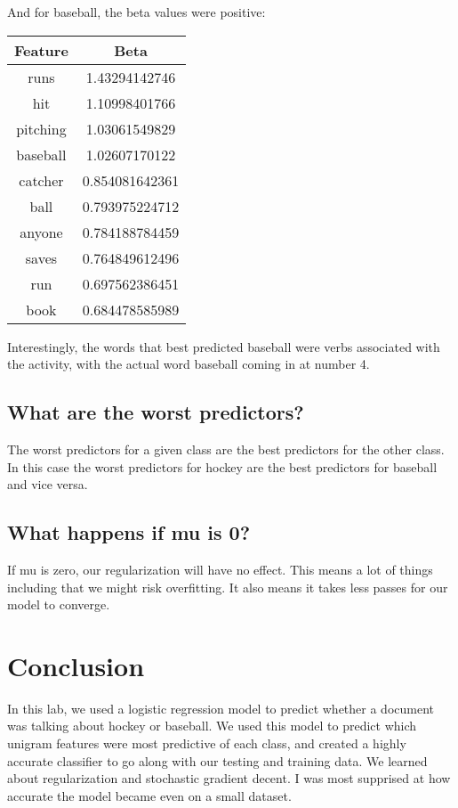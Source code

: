 \documentclass{article}
\begin{document}
And for baseball, the beta values were positive:

\begin{tabular}{|c|c|}
  Feature & Beta \\
  \hline
  runs & 1.43294142746 \\
  hit & 1.10998401766 \\
  pitching & 1.03061549829 \\
  baseball & 1.02607170122 \\
  catcher & 0.854081642361 \\
  ball & 0.793975224712 \\
  anyone & 0.784188784459 \\
  saves & 0.764849612496 \\
  run & 0.697562386451 \\
  book & 0.684478585989 \\
  
\end{tabular}

Interestingly, the words that best predicted baseball were verbs associated with the activity, with the actual word baseball coming in at number 4.

\subsection{What are the worst predictors?}
The worst predictors for a given class are the best predictors for the other class. In this case the worst predictors for hockey are the best predictors for baseball and vice versa.

\subsection{What happens if mu is 0?}
If mu is zero, our regularization will have no effect. This means a lot of things including that we might risk overfitting. It also means it takes less passes for our model to converge.

\section{Conclusion}
In this lab, we used a logistic regression model to predict whether a document was talking about hockey or baseball. We used this model to predict which unigram features were most predictive of each class, and created a highly accurate classifier to go along with our testing and training data. We learned about regularization and stochastic gradient decent. I was most supprised at how accurate the model became even on a small dataset. 
\end{document}
